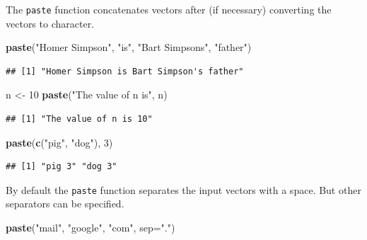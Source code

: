 \documentclass[
]{krantz}
\newenvironment{Shaded}{\begin{snugshade}}{\end{snugshade}}
\newcommand{\DataTypeTok}[1]{\textcolor[rgb]{0.13,0.29,0.53}{#1}}
\newcommand{\DecValTok}[1]{\textcolor[rgb]{0.00,0.00,0.81}{#1}}
\newcommand{\KeywordTok}[1]{\textcolor[rgb]{0.13,0.29,0.53}{\textbf{#1}}}
\newcommand{\NormalTok}[1]{#1}
\newcommand{\StringTok}[1]{\textcolor[rgb]{0.31,0.60,0.02}{#1}}
\begin{document}
The \texttt{paste} function concatenates vectors after (if necessary) converting the vectors to character.

\begin{Shaded}
\begin{Highlighting}[]
\KeywordTok{paste}\NormalTok{(}\StringTok{"Homer Simpson"}\NormalTok{, }\StringTok{"is"}\NormalTok{, }\StringTok{"Bart Simpson\textquotesingle{}s"}\NormalTok{, }\StringTok{"father"}\NormalTok{)}
\end{Highlighting}
\end{Shaded}

\begin{verbatim}
## [1] "Homer Simpson is Bart Simpson's father"
\end{verbatim}

\begin{Shaded}
\begin{Highlighting}[]
\NormalTok{n \textless{}{-}}\StringTok{ }\DecValTok{10}
\KeywordTok{paste}\NormalTok{(}\StringTok{"The value of n is"}\NormalTok{, n)}
\end{Highlighting}
\end{Shaded}

\begin{verbatim}
## [1] "The value of n is 10"
\end{verbatim}

\begin{Shaded}
\begin{Highlighting}[]
\KeywordTok{paste}\NormalTok{(}\KeywordTok{c}\NormalTok{(}\StringTok{"pig"}\NormalTok{, }\StringTok{"dog"}\NormalTok{), }\DecValTok{3}\NormalTok{)}
\end{Highlighting}
\end{Shaded}

\begin{verbatim}
## [1] "pig 3" "dog 3"
\end{verbatim}

By default the \texttt{paste} function separates the input vectors with a space. But other separators can be specified.

\begin{Shaded}
\begin{Highlighting}[]
\KeywordTok{paste}\NormalTok{(}\StringTok{"mail"}\NormalTok{, }\StringTok{"google"}\NormalTok{, }\StringTok{"com"}\NormalTok{, }\DataTypeTok{sep=}\StringTok{"."}\NormalTok{)}
\end{Highlighting}
\end{Shaded}
\end{document}
